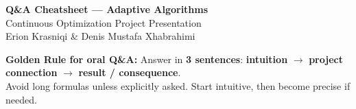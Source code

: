 \documentclass[a4paper,9pt]{article}
\begin{document}
\begin{center}
    {\LARGE \textbf{Q\&A Cheatsheet --- Adaptive Algorithms}}\\
    \vspace{2pt}
    {\large Continuous Optimization Project Presentation}\\
    \vspace{2pt}
    Erion Krasniqi \& Denis Mustafa Xhabrahimi
\end{center}

\vspace{-2mm}

\begin{tcolorbox}[colback=unibaselteal!35,colframe=unibaselteal]
\textbf{Golden Rule for oral Q\&A:}
Answer in \textbf{3 sentences}: 
\textbf{intuition} $\rightarrow$ \textbf{project connection} $\rightarrow$ \textbf{result / consequence}.\\
Avoid long formulas unless explicitly asked. Start intuitive, then become precise if needed.
\end{tcolorbox}
\end{document}
